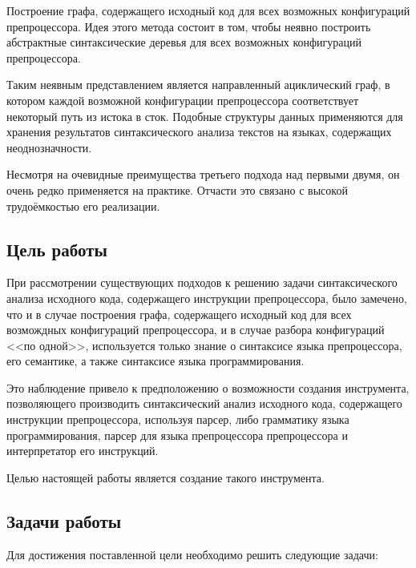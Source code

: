 \begin{enumerate}
Построение графа, содержащего исходный код для всех возможных конфигураций препроцессора. Идея этого метода состоит в том, чтобы неявно построить абстрактные синтаксические деревья для всех возможных конфигураций препроцессора. 


Таким неявным представлением является направленный ациклический граф, в котором каждой возможной конфигурации препроцессора соответствует некоторый путь из истока в сток. Подобные структуры данных применяются для хранения результатов синтаксического анализа текстов на языках, содержащих неоднозначности\cite{parseforests}.

\end{enumerate}

Несмотря на очевидные преимущества третьего подхода над первыми двумя, он очень редко применяется на практике. Отчасти это связано с высокой трудоёмкостью его реализации.

\subsection{Цель работы}

При рассмотрении существующих подходов к решению задачи синтаксического анализа исходного кода, содержащего инструкции препроцессора, было замечено, что и в случае построения графа, содержащего исходный код для всех возмождных конфигураций препроцессора, и в случае разбора конфигураций <<по одной>>, используется только знание о синтаксисе языка препроцессора, его семантике, а также синтаксисе языка программирования.

Это наблюдение привело к предположению о возможности создания инструмента, позволяющего производить синтаксический анализ исходного кода, содержащего инструкции препроцессора, используя парсер, либо грамматику языка программирования, парсер для языка препроцессора препроцессора и интерпретатор его инструкций.

Целью настоящей работы является создание такого инструмента.

\subsection{Задачи работы}

Для достижения поставленной цели необходимо решить следующие задачи:

